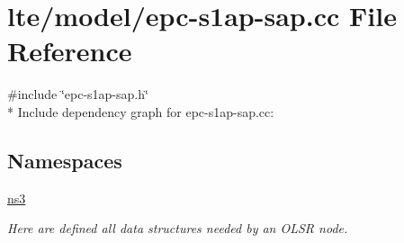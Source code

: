 \hypertarget{epc-s1ap-sap_8cc}{}\section{lte/model/epc-\/s1ap-\/sap.cc File Reference}
\label{epc-s1ap-sap_8cc}
{\ttfamily \#include \char`\"{}epc-\/s1ap-\/sap.\+h\char`\"{}}\\*
Include dependency graph for epc-\/s1ap-\/sap.cc\+:
\subsection*{Namespaces}
\begin{DoxyCompactItemize}
\item 
 \hyperlink{namespacens3}{ns3}
\begin{DoxyCompactList}\small\item\em Here are defined all data structures needed by an O\+L\+SR node. \end{DoxyCompactList}\end{DoxyCompactItemize}
